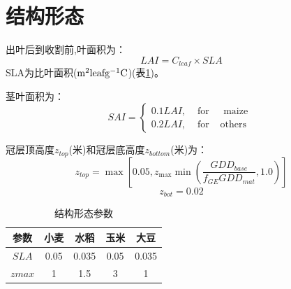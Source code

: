 \section{结构形态}
出叶后到收割前,叶面积为：
\begin{equation}
LAI=C_{leaf} \times SLA
\end{equation}
SLA为比叶面积($\rm m^2 leaf g^{-1} C$)(表\ref{tab:结构形态参数})。

茎叶面积为：
\begin{equation}
SAI=\left\{\begin{array}{lcc}0.1 LAI, & \text { for } & \text { maize } \\
   0.2 LAI, & \text { for } & \text {others}\end{array}\right.
\end{equation}

冠层顶高度$z_{top}$(米)和冠层底高度$z_{bottom}$(米)为：
\begin{equation}
z_{top}=\max \left[0.05, z_{\max} \min \left(\frac{GDD_{base}}{f_{GE} G D D_{mat}}, 1.0\right)\right]
\end{equation}
\begin{equation}
z_{b o t}=0.02
\end{equation}

\begin{table}[]
  \centering
  \caption{结构形态参数}
  \label{tab:结构形态参数}
  \begin{tabular}{@{}ccccc@{}}
  \toprule
  参数   & 小麦   & 水稻    & 玉米   & 大豆    \\ \midrule
  $SLA$  & 0.05 & 0.035 & 0.05 & 0.035 \\
  $zmax$ & 1    & 1.5   & 3    & 1     \\ \bottomrule
  \end{tabular}
  \end{table}
